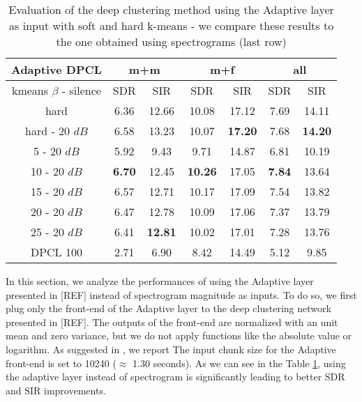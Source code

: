 \documentclass[master,final,11pt]{iscs-thesis}
\begin{document}
\begin{table}[h]
\centering
\begin{tabular}{c|c|c|c|c|c|c}
Adaptive DPCL & \multicolumn{2}{c|}{m+m} & \multicolumn{2}{c|}{m+f} & \multicolumn{2}{c}{all} \\ 
\hline 
kmeans $\beta$ - silence & SDR & SIR & SDR & SIR & SDR & SIR \\ 
\hline 
hard & 6.36 & 12.66 & 10.08 & 17.12 & 7.69 & 14.11 \\ 
hard - 20 $dB$ & 6.58 & 13.23 & 10.07 & \textbf{17.20} & 7.68 & \textbf{14.20} \\ 
\hline 
\hline 
5 - 20 $dB$ & 5.92 & 9.43 & 9.71 & 14.87 & 6.81 & 10.19 \\ 
10 - 20 $dB$ & \textbf{6.70} & 12.45 & \textbf{10.26} & 17.05 & \textbf{7.84} & 13.64 \\ 
15 - 20 $dB$ & 6.57 & 12.71 & 10.17 & 17.09 & 7.54 & 13.82 \\ 
20 - 20 $dB$ & 6.47 & 12.78 & 10.09 & 17.06 & 7.37 & 13.79 \\ 
25 - 20 $dB$ & 6.41 & \textbf{12.81} & 10.02 & 17.01 & 7.28 & 13.76 \\ 
\hline 
\hline 
DPCL 100 & 2.71 & 6.90 & 8.42 & 14.49 & 5.12 & 9.85 \\ 
\end{tabular}
\captionsetup{justification=centering}
\caption{Evaluation of the deep clustering method using the Adaptive layer as input with soft and hard k-means - we compare these results to the one obtained using spectrograms  (last row)}
\label{table:AdaptDPCL100}
\end{table}


In this section, we analyze the performances of using the Adaptive layer presented in [REF] instead of spectrogram magnitude as inputs.
To do so, we first plug only the front-end of the Adaptive layer to the deep clustering network presented in [REF]. The outputs of the front-end are normalized with an unit mean and zero variance, 
but we do not apply functions like the absolute value or logarithm. As suggested in \cite{DPCLV2}, we report
The input chunk size for the Adaptive front-end is set to 10240 ($\approx$ 1.30 seconds). 
As we can see in the Table \ref{table:AdaptDPCL100}, using the adaptive layer instead of spectrogram is significantly leading to better SDR and SIR improvements.
\end{document}

